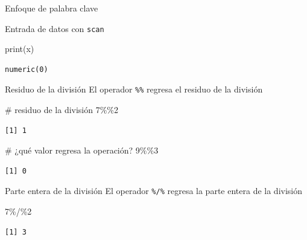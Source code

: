 \documentclass[
  ignorenonframetext,
  aspectratio=169,
  spanish,
]{beamer}
\newenvironment{Shaded}{\begin{snugshade}}{\end{snugshade}}
\newcommand{\CommentTok}[1]{\textcolor[rgb]{0.37,0.37,0.37}{#1}}
\newcommand{\DecValTok}[1]{\textcolor[rgb]{0.68,0.00,0.00}{#1}}
\newcommand{\FunctionTok}[1]{\textcolor[rgb]{0.28,0.35,0.67}{#1}}
\newcommand{\NormalTok}[1]{\textcolor[rgb]{0.00,0.23,0.31}{#1}}
\newcommand{\SpecialCharTok}[1]{\textcolor[rgb]{0.37,0.37,0.37}{#1}}
\begin{document}
\begin{frame}[fragile]{Enfoque de palabra clave}
\begin{block}{Entrada de datos con \texttt{scan}}
\begin{Shaded}
\begin{Highlighting}[]
\FunctionTok{print}\NormalTok{(x)}
\end{Highlighting}
\end{Shaded}

\begin{verbatim}
numeric(0)
\end{verbatim}
\end{block}
\end{frame}

\begin{frame}[fragile]{Residuo de la división}
\label{residuo-de-la-divisiuxf3n-1}
El operador \texttt{\%\%} regresa el residuo de la división

\begin{Shaded}
\begin{Highlighting}[]
\CommentTok{\# residuo de la división }
\DecValTok{7}\SpecialCharTok{\%\%}\DecValTok{2}
\end{Highlighting}
\end{Shaded}

\begin{verbatim}
[1] 1
\end{verbatim}

\begin{Shaded}
\begin{Highlighting}[]
\CommentTok{\# ¿qué valor regresa la operación?  }
\DecValTok{9}\SpecialCharTok{\%\%}\DecValTok{3} 
\end{Highlighting}
\end{Shaded}

\begin{verbatim}
[1] 0
\end{verbatim}
\end{frame}

\begin{frame}[fragile]{Parte entera de la división}
\label{parte-entera-de-la-divisiuxf3n-1}
El operador \texttt{\%/\%} regresa la parte entera de la división

\begin{Shaded}
\begin{Highlighting}[]
\DecValTok{7}\SpecialCharTok{\%/\%}\DecValTok{2}
\end{Highlighting}
\end{Shaded}

\begin{verbatim}
[1] 3
\end{verbatim}
\end{frame}
\end{document}
